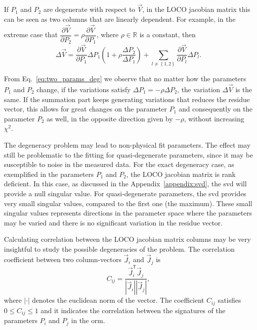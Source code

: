 If $P_1$ and $P_2$ are degenerate with respect to $\vec{V}$, in the LOCO jacobian matrix this can be seen as two columns that are linearly dependent. For example, in the extreme case that $\dfrac{\partial \vec{V}}{\partial P_{2}} = \rho \dfrac{\partial \vec{V}}{\partial P_{1}}$, where $\rho \in \mathbb{R}$ is a constant, then 
\begin{equation}
\Delta \vec{V} = \dfrac{\partial \vec{V}}{\partial P_{1}} \Delta P_{1}\left(1 + \rho \dfrac{\Delta P_2}{\Delta P_1}\right) + \sum_{l \neq \left\{1,2\right\}}\dfrac{\partial \vec{V}}{\partial P_{l}} \Delta P_{l}.
\label{eq:two_params_deg}
\end{equation}

From Eq.~\eqref{eq:two_params_deg} we observe that no matter how the parameters $P_1$ and $P_2$ change, if the variations satisfy $\Delta P_1 = - \rho \Delta P_2$, the variation $\Delta \vec{V}$ is the same. If the summation part keeps generating variations that reduces the residue vector, this allows for great changes on the parameter $P_1$ and consequently on the parameter $P_2$ as well, in the opposite direction given by $-\rho$, without increasing $\chi^2$.

The degeneracy problem may lead to non-physical fit parameters. The effect may still be problematic to the fitting for quasi-degenerate parameters, since it may be susceptible to noise in the measured data. For the exact degeneracy case, as exemplified in the parameters $P_1$ and $P_2$, the LOCO jacobian matrix is rank deficient. In this case, as discussed in the Appendix~\ref{appendix:svd}, the \gls{svd} will provide a null singular value. For quasi-degenerate parameters, the \gls{svd} provides very small singular values, compared to the first one (the maximum). These small singular values represents directions in the parameter space where the parameters may be varied and there is no significant variation in the residue vector. 

Calculating correlation between the LOCO jacobian matrix columns may be very insightful to study the possible degeneracies of the problem. The correlation coefficient between two column-vectors $\vec{J}_i$ and $\vec{J}_j$ is
\begin{equation}
    C_{ìj} = \dfrac{\vec{J}_i^{\mathsf{T}}\vec{J}_j}{|\vec{J}_i||\vec{J}_j|},
\end{equation}
where $|\cdot|$ denotes the euclidean norm of the vector. The coefficient $C_{ij}$ satisfies $0 \leq C_{ij} \leq 1$ and it indicates the correlation between the signatures of the parameters $P_i$ and $P_j$ in the \gls{orm}.

